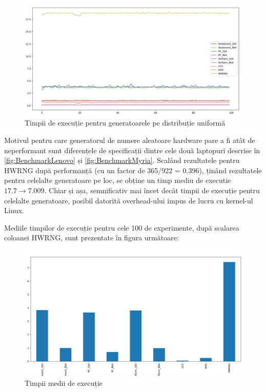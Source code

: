 \begin{figure}[H]
    \centering
    \includegraphics[width=1.0\textwidth]{continut/capitol4/figuri/PerformancesUniform.png}
    \caption{Timpii de execuție pentru generatoarele pe distribuție uniformă}
    \label{fig:UniformPerformances}
\end{figure}

Motivul pentru care generatorul de numere aleatoare hardware pare a fi atât de neperformant sunt diferențele de specificații dintre cele două laptopuri descrise în \ref{fig:BenchmarkLenovo} și \ref{fig:BenchmarkMyria}. Scalând rezultatele pentru HWRNG după performanță (cu un factor de 365/922 = 0.396), ținând rezultatele pentru celelalte generatoare pe loc, se obține un timp mediu de executie $17.7 \longrightarrow 7.009$. Chiar și așa, semnificativ mai încet decât timpii de execuție pentru celelalte generatoare, posibil datorită overhead-ului impus de lucru cu kernel-ul Linux.

Mediile timpilor de execuție pentru cele 100 de experimente, după scalarea coloanei HWRNG, sunt prezentate în figura următoare:

\begin{figure}[H]
    \centering
    \includegraphics[width=1.0\textwidth]{continut/capitol4/figuri/UniformMeanTimes.png}
    \caption{Timpii medii de execuție}
    \label{fig:UniformMeanTimes}
\end{figure}

